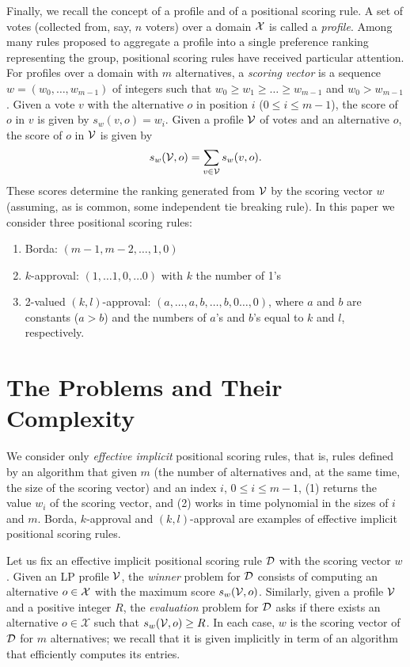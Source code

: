Finally, we recall the concept of a profile and of a positional
scoring rule. A set of votes (collected from, say, $n$ voters) over 
a domain $\mathcal{X}$ is 
called a \emph{profile}. Among many rules proposed to aggregate a profile 
into a single preference ranking representing the group, positional
scoring rules have received particular attention. For profiles over a domain
with $m$ alternatives, a \emph{scoring vector} is a sequence $w= (w_0,\ldots,
w_{m-1})$ of integers such that $w_0\geq w_1 \geq \ldots \geq w_{m-1}$
and $w_0 > w_{m-1}$. Given a vote
$v$ with the alternative $o$ in position $i$ ($0 \leq i \leq m-1$), 
the score of $o$ in
$v$ is given
by $s_w(v,o)=w_i$. Given a profile $\mathcal{V}$ of votes and an alternative $o$,
the score of $o$ in $\mathcal{V}$ is given by 
$$s_w(\mathcal{V},o) = \sum_{v\in \mathcal{V}} s_w(v,o).$$ 
These scores determine the ranking generated from $\mathcal{V}$ by the scoring
vector $w$ (assuming, as is common, some independent tie breaking rule). 
In this paper we consider three positional scoring rules:
\begin{enumerate}
\item Borda: $(m-1,m-2,\ldots, 1,0)$
\item $k$-approval: $(1,\ldots 1,0,\ldots 0)$ with $k$ the number of 1's
\item 2-valued $(k,l)$-approval: $(a,\ldots, a, b,\ldots, b, 0\ldots, 0)$,
			where $a$ and $b$ are constants ($a>b$)
			and the numbers of $a$'s and $b$'s equal to $k$ and $l$,
			respectively.
\end{enumerate}
  

\section{The Problems and Their Complexity}

We consider only \emph{effective implicit} positional scoring rules, 
that is, rules defined by an algorithm that given $m$ (the number of 
alternatives and, at the same time, the size of the scoring vector) 
and an index $i$, $0\leq i\leq m-1$, (1) returns the value $w_i$ of 
the scoring vector, and (2) works in time polynomial in the sizes of 
$i$ and $m$. Borda, $k$-approval and $(k,l)$-approval are examples 
of effective implicit positional scoring rules. 

Let us fix an effective implicit positional scoring rule $\mathcal{D}$ with the
scoring vector $w$. Given an LP profile $\mathcal{V}$, the \emph{winner} problem for
$\mathcal{D}$ consists of computing an alternative $o \in \mathcal{X}$ with the maximum 
score $s_w(\mathcal{V},o)$. Similarly, given a profile $\mathcal{V}$ and a positive integer 
$R$, the \emph{evaluation} problem for $\mathcal{D}$ asks if there exists an 
alternative $o \in \mathcal{X}$ such that $s_{{w}}(\mathcal{V}, o)\geq R$. In 
each case, $w$ is the scoring vector of $\mathcal{D}$ for $m$ alternatives; we recall
that it is given implicitly in term of an algorithm that efficiently 
computes its entries.
     
